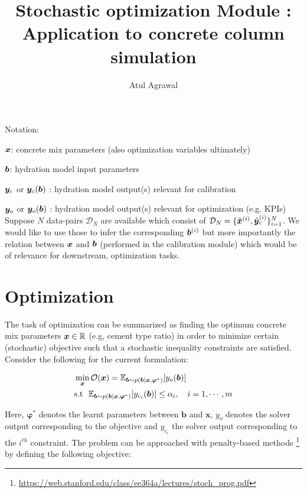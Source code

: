\documentclass[a4paper,11pt]{article}
\title{Stochastic optimization Module : Application to concrete column simulation}
\author{Atul Agrawal}
\begin{document}
\maketitle




Notation:
\bi
\item $\boldsymbol{x}$: concrete mix parameters (also optimization variables ultimately)
\item $\boldsymbol{b}$: hydration model input parameters
\item $\boldsymbol{y}_c$ or $\boldsymbol{y}_c(\boldsymbol{b})$ : hydration model output(s) relevant for calibration
\item $\boldsymbol{y}_o$ or $\boldsymbol{y}_o(\boldsymbol{b})$ : hydration model  output(s) relevant for optimization (e.g. KPIs)
\ei
Suppose $N$ data-pairs $\mathcal{D}_N$  are available which consist of $\mathcal{D}_N=\{ \hat{\boldsymbol{x}}^{(i)},  \hat{\boldsymbol{y}}_c^{(i)}\}_{i=1}^N$. We would like to use those to infer the corresponding $\boldsymbol{b}^{(i)}$ but more importantly the relation between $\boldsymbol{x}$ and $\boldsymbol{b}$ (performed in the calibration module)  which would be of relevance for downstream, optimization tasks.






\section{Optimization}

The task of optimization can be summarized as finding the optimum concrete mix parameters $\bm x \in \mathbb R$ (e.g, cement type ratio) in order to minimize certain (stochastic) objective such that a stochastic inequality constraints are satisfied. Consider the following for the current formulation:

\begin{align}
	&\min_{\bm x} \mathcal{O}(\bm x)= \mathbb{E}_{\bm b\sim p(\bm b | \bm x, \bm {\varphi}^*)}[y_{o}(\bm b)]\\
	&\text{s.t} ~~ \mathbb{E}_{\bm b\sim p(\bm b | \bm x, \bm {\varphi}^*)}[y_{c_i}(\bm b)] \leq \alpha_i, \quad i = 1,\cdots, m
\end{align}

Here, $\bm{\varphi}^*$ denotes the learnt parameters between  $\bm b$ and $\bm x$, $y_{o}$ denotes the solver output corresponding to the objective and $y_{c_i}$ the solver output corresponding to the $i^{th}$ constraint. 
The problem can be approached with penalty-based methods
\footnote{ \href{https://web.stanford.edu/class/ee364a/lectures/stoch\_prog.pdf}{https://web.stanford.edu/class/ee364a/lectures/stoch\_prog.pdf} } \cite{wang_stochastic_2003}  by defining the following objective:
\end{document}
